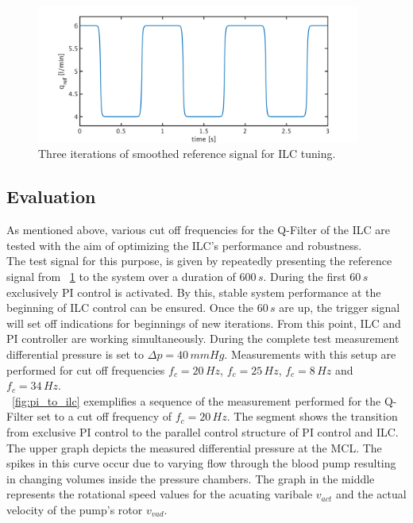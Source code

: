 \begin{figure}[ht]
  \centering
  \includegraphics[width=0.95\textwidth]{images/chapt_5/ILC/ref_signal_ILC3.pdf}
  \caption[Smoothed reference signal for ILC tuning.]{Three iterations of smoothed reference signal for ILC tuning.}
  \label{fig:ref_signal_ILC3}
\end{figure}
\subsection{Evaluation}
As mentioned above, various cut off frequencies for the Q-Filter of the ILC are tested with the aim of optimizing the ILC's performance and robustness.  \\The test signal for this purpose, is given by repeatedly presenting the reference signal from \figurename~\ref{fig:ref_signal_ILC3} to the system over a duration of $600\,s$. During the first $60\,s$ exclusively PI control is activated. By this, stable system performance at the beginning of ILC control can be ensured. Once the $60\,s$ are up, the trigger signal will set off indications for beginnings of new iterations. From this point, ILC and PI controller are working simultaneously. During the complete test measurement differential pressure is set to $\Delta{p}=40\,mmHg$. Measurements with this setup are performed for cut off frequencies $f_{c}=20\,Hz$, $f_{c}=25\,Hz$, $f_{c}=8\,Hz$ and $f_{c}=34\,Hz$.
\\\figurename~\ref{fig:pi_to_ilc} exemplifies a sequence of the measurement performed for the Q-Filter set to a cut off frequency of $f_c=20\,Hz$. The segment shows the transition from exclusive PI control to the parallel control structure of PI control and ILC. The upper graph depicts the measured differential pressure at the MCL. The spikes in this curve occur due to varying flow through the blood pump resulting in changing volumes inside the pressure chambers. The graph in the middle represents the rotational speed values for the acuating varibale $v_{act}$ and the actual velocity of the pump's rotor $v_{vad}$.

